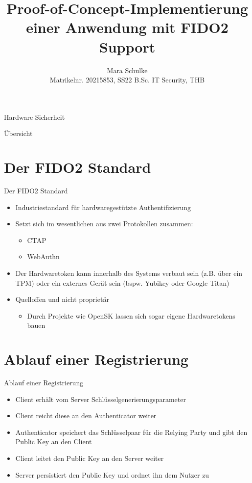 \documentclass{beamer}
\title{Proof-of-Concept-Implementierung einer Anwendung mit FIDO2 Support}
\author{Mara Schulke\\\tiny{Matrikelnr. 20215853, SS22 B.Sc. IT Security, THB}}
\begin{document}
\begin{frame}
	\begin{center}Hardware Sicherheit\end{center}
	\vspace{1em}
	\titlepage
\end{frame}

\begin{frame}{Übersicht}
	\tableofcontents
\end{frame}

\section{Der FIDO2 Standard}
\begin{frame}{Der FIDO2 Standard}
	\begin{itemize}
		\item Industriestandard für hardwaregestützte Authentifizierung
		\item Setzt sich im wesentlichen aus zwei
			Protokollen zusammen:
			\begin{itemize}
				\item CTAP
				\item WebAuthn
			\end{itemize}
		\item Der Hardwaretoken kann innerhalb des Systems verbaut sein (z.B.
			über ein TPM) oder ein externes Gerät sein (bspw. Yubikey oder
			Google Titan)
		\item Quelloffen und nicht proprietär
			\begin{itemize}
				\item Durch Projekte wie OpenSK lassen sich sogar eigene
					Hardwaretokens bauen
			\end{itemize}
	\end{itemize}
\end{frame}

\section{Ablauf einer Registrierung}
\begin{frame}{Ablauf einer Registrierung}
	\begin{itemize}
		\item Client erhält vom Server Schlüsselgenerierungsparameter
		\item Client reicht diese an den Authenticator weiter
		\item Authenticator speichert das Schlüsselpaar für die Relying Party und gibt den Public Key an den Client
		\item Client leitet den Public Key an den Server weiter
		\item Server persistiert den Public Key und ordnet ihn dem Nutzer zu
	\end{itemize}
\end{frame}
\end{document}
